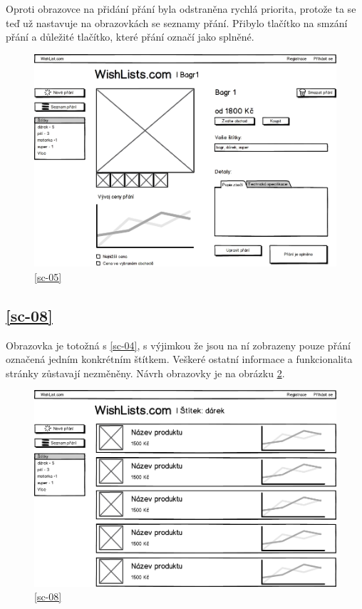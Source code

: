 Oproti obrazovce na přidání přání byla odstraněna rychlá priorita, protože ta se teď už nastavuje na obrazovkách se seznamy přání. Přibylo tlačítko na smzání přání a důležité tlačítko, které přání označí jako splněné.

\begin{figure}[htb]
\begin{center}
\includegraphics[width=130mm]{./pictures/mock/editace-detail-prani.png}
\caption{\ref{sc-05}}
\label{fig:editace-detail-prani}
\end{center}
\end{figure}

\subsection{\ref{sc-08}}
\label{sec:prani-podle-stitku}
Obrazovka je totožná s \ref{sc-04}, s výjimkou že jsou na ní zobrazeny pouze přání označená jedním konkrétním štítkem. Veškeré ostatní informace a funkcionalita stránky zůstavají nezměněny. Návrh obrazovky je na obrázku \ref{fig:prani-oznacena-tagem}.

\begin{figure}[htb]
\begin{center}
\includegraphics[width=130mm]{./pictures/mock/prani-oznacena-tagem.png}
\caption{\ref{sc-08}}
\label{fig:prani-oznacena-tagem}
\end{center}
\end{figure}

